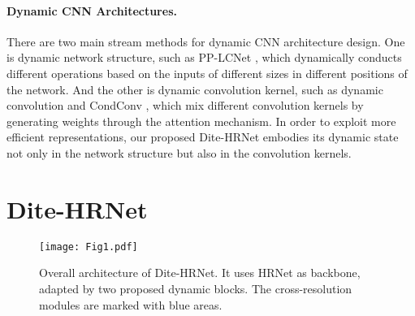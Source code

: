 \documentclass{article}
\begin{document}
\paragraph{Dynamic CNN Architectures.} There are two main stream methods for dynamic CNN architecture design. One is dynamic network structure, such as PP-LCNet \cite{cui:pplcnet}, which dynamically conducts different operations based on the inputs of different sizes in different positions of the network. And the other is dynamic convolution kernel, such as dynamic convolution \cite{chen:dyconv} and CondConv \cite{yang:condconv}, which mix different convolution kernels by generating weights through the attention mechanism. In order to exploit more efficient representations, our proposed Dite-HRNet embodies its dynamic state not only in the network structure but also in the convolution kernels.

\section{Dite-HRNet}

\begin{figure}[t]
\centering
\texttt{[image: Fig1.pdf]}
\caption{Overall architecture of Dite-HRNet. It uses HRNet \protect \cite{sun:hrnet} as backbone, adapted by two proposed dynamic blocks. The cross-resolution modules are marked with blue areas.}
\label{fig1}
\end{figure}

\begin{table}[t]
\centering
{}
\caption{Structure of Dite-HRNet. DGC = Dynamic Global Context. DMC = Dynamic Multi-scale Context. \# = number of.  denotes repetitions of each operator in one cross-resolution module.}
\label{tab1}
\end{table}
\end{document}
